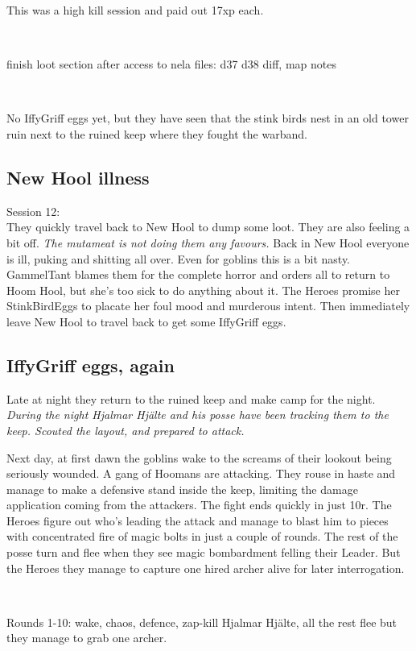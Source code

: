 This was a high kill session and paid out 17xp each.

\

\todo finish loot section after access to nela files: d37 d38 diff, map notes

\

No IffyGriff eggs yet, but they have seen that the stink birds nest in an old tower ruin next to the ruined keep where they fought the warband.


\subsection*{New Hool illness}

\forceindent Session 12:\\                                       %
They quickly travel back to New Hool to dump some loot. They are also feeling a bit off. \emph{The mutameat is not doing them any favours.} Back in New Hool everyone is ill, puking and shitting all over. Even for goblins this is a bit nasty. GammelTant blames them for the complete horror and orders all to return to Hoom Hool, but she's too sick to do anything about it. The Heroes promise her StinkBirdEggs to placate her foul mood and murderous intent. Then immediately leave New Hool to travel back to get some IffyGriff eggs.


\subsection*{IffyGriff eggs, again}

Late at night they return to the ruined keep and make camp for the night.
\emph{During the night Hjalmar Hjälte and his posse have been tracking them to the keep. Scouted the layout, and prepared to attack.}

Next day, at first dawn the goblins wake to the screams of their lookout being seriously wounded. A gang of Hoomans are attacking. They rouse in haste and manage to make a defensive stand inside the keep, limiting the damage application coming from the attackers. The fight ends quickly in just 10r. The Heroes figure out who's leading the attack and manage to blast him to pieces with concentrated fire of magic bolts in just a couple of rounds. The rest of the posse turn and flee when they see magic bombardment felling their Leader. But the Heroes they manage to capture one hired archer alive for later interrogation.

\

Rounds 1-10: wake, chaos, defence, zap-kill Hjalmar Hjälte, all the rest flee but they manage to grab one archer.


